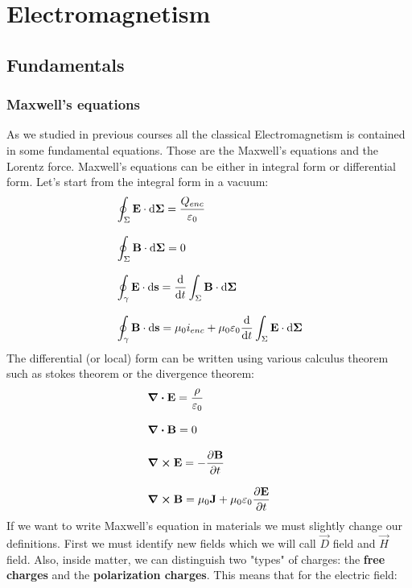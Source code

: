 \part{Electromagnetism}
\chapter{Fundamentals}
\section{Maxwell's equations}
As we studied in previous courses all the classical Electromagnetism is contained in some fundamental equations. Those are the Maxwell's equations and the Lorentz force. Maxwell's equations can be either in integral form or differential form. Let's start from the integral form in a vacuum:
\begin{equation} \label{e:int_Maxwell_eq}
  \begin{split}
    &\oint_{\Sigma} \vec{E} \cdot \dd{\vec{\Sigma}} = \dfrac{Q_{enc}}{\epsz}\\[8pt]
    &\oint_{\Sigma} \vec{B} \cdot \dd{\vec{\Sigma}} = 0\\[8pt]
    &\oint_{\gamma} \vec{E} \cdot \dd{\vec{s}} = \dv{}{t}\int_{\Sigma} \vec{B} \cdot \dd{\vec{\Sigma}}\\[8pt]
    &\oint_{\gamma} \vec{B} \cdot \dd{\vec{s}} = \muz i_{enc} + \muz \epsz \dv{}{t}\int_{\Sigma} \vec{E} \cdot \dd{\vec{\Sigma}}
  \end{split}
\end{equation}
The differential (or local) form can be written using various calculus theorem such as stokes theorem or the divergence theorem:
\begin{equation} \label{e:diff_Maxwell_eq}
  \begin{split}
    &\div{\vec{E}} = \dfrac{\rho}{\epsz}\\[8pt]
    &\div{\vec{B}} = 0\\[8pt]
    &\curl{\vec{E}} = -\pdv{\vec{B}}{t}\\[8pt]
    &\curl{\vec{B}} = \muz \vec{J} + \muz \epsz \pdv{\vec{E}}{t}
  \end{split}
\end{equation}
If we want to write Maxwell's equation in materials we must slightly change our definitions. First we must identify new fields which we will call $\vec{D}$ field and $\vec{H}$ field.
Also, inside matter, we can distinguish two "types" of charges: the \textbf{free charges} and the \textbf{polarization charges}. This means that for the electric field:
